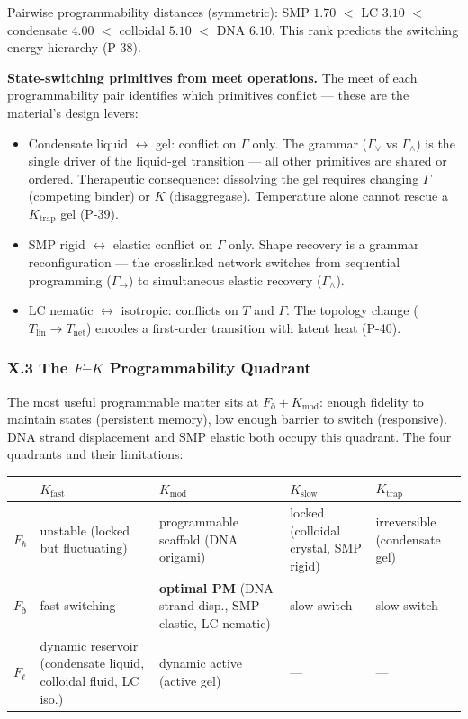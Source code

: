 \documentclass[12pt,a4paper]{article}
\begin{document}
Pairwise programmability distances (symmetric): SMP $1.70$ $<$ LC $3.10$ $<$ condensate $4.00$ $<$ colloidal $5.10$ $<$ DNA $6.10$. This rank predicts the switching energy hierarchy (P-38).

\textbf{State-switching primitives from meet operations.} The meet of each programmability pair identifies which primitives conflict --- these are the material's design levers:

\begin{itemize}
    \item Condensate liquid $\leftrightarrow$ gel: conflict on $\Gamma$ only. The grammar ($\Gamma_\vee$ vs $\Gamma_\wedge$) is the single driver of the liquid-gel transition --- all other primitives are shared or ordered. Therapeutic consequence: dissolving the gel requires changing $\Gamma$ (competing binder) or $K$ (disaggregase). Temperature alone cannot rescue a $K_\text{trap}$ gel (P-39).
    \item SMP rigid $\leftrightarrow$ elastic: conflict on $\Gamma$ only. Shape recovery is a grammar reconfiguration --- the crosslinked network switches from sequential programming ($\Gamma_\to$) to simultaneous elastic recovery ($\Gamma_\wedge$).
    \item LC nematic $\leftrightarrow$ isotropic: conflicts on $T$ and $\Gamma$. The topology change ($T_\text{lin} \to T_\text{net}$) encodes a first-order transition with latent heat (P-40).
\end{itemize}

\subsubsection{X.3 The $F$--$K$ Programmability Quadrant}

The most useful programmable matter sits at $F_\eth + K_\text{mod}$: enough fidelity to maintain states (persistent memory), low enough barrier to switch (responsive). DNA strand displacement and SMP elastic both occupy this quadrant. The four quadrants and their limitations:

\begin{table}[htbp]
\centering
\small
{}
\begin{tabularx}{\textwidth}{>{\centering\arraybackslash}X >{\centering\arraybackslash}X >{\centering\arraybackslash}X >{\centering\arraybackslash}X >{\centering\arraybackslash}X}
\toprule
\rowcolor{gray!25}\textbf{} & \textbf{$K_\text{fast}$} & \textbf{$K_\text{mod}$} & \textbf{$K_\text{slow}$} & \textbf{$K_\text{trap}$} \\
\midrule
\rowcolors{1}{white}{gray!10}
$F_\hbar$ & unstable (locked but fluctuating) & programmable scaffold (DNA origami) & locked (colloidal crystal, SMP rigid) & irreversible (condensate gel) \\
$F_\eth$ & fast-switching & \textbf{optimal PM} (DNA strand disp., SMP elastic, LC nematic) & slow-switch & slow-switch \\
$F_\ell$ & dynamic reservoir (condensate liquid, colloidal fluid, LC iso.) & dynamic active (active gel) & --- & --- \\
\bottomrule
\end{tabularx}
\end{table}
\end{document}
